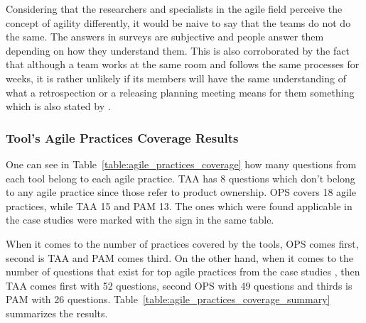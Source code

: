 Considering that the researchers and specialists in the agile field perceive the concept of agility differently, it would be naive to say that the teams do not do the same. The answers in surveys are subjective and people answer them depending on how they understand them. This is also corroborated by the fact that although a team works at the same room and follows the same processes for weeks, it is rather unlikely if its members will have the same understanding of what a retrospection or a releasing planning meeting means for them something which is also stated by \citet{Williams_Microsoft}.

\subsubsection{Tool's Agile Practices Coverage Results}
\label{subsubsec:coverage_results}
One can see in Table~\ref{table:agile_practices_coverage} how many questions from each tool belong to each agile practice. \ac{TAA} has 8 questions which don't belong to any agile practice since those refer to product ownership. \ac{OPS} covers 18 agile practices, while \ac{TAA} 15 and \ac{PAM} 13. The ones which were found applicable in the case studies \cite{Williams_Microsoft, laurie_williams} were marked with the sign \CrossMaltese in the same table.

When it comes to the number of practices covered by the tools, \ac{OPS} comes first, second is \ac{TAA} and \ac{PAM} comes third. On the other hand, when it comes to the number of questions that exist for top agile practices from the case studies \cite{Williams_Microsoft, laurie_williams}, then \ac{TAA} comes first with 52 questions, second \ac{OPS} with 49 questions and thirds is \ac{PAM} with 26 questions. Table~\ref{table:agile_practices_coverage_summary} summarizes the results.

